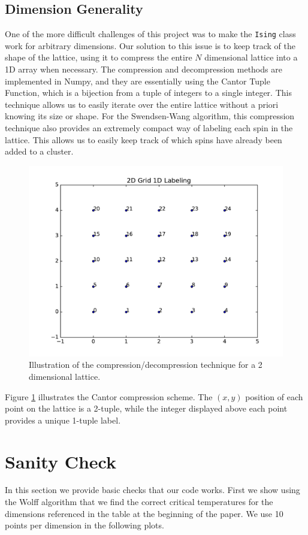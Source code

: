 \documentclass[a4paper]{article}
\begin{document}
\subsection{Dimension Generality}

One of the more difficult challenges of this project was to make the \texttt{Ising} class work for arbitrary dimensions. Our solution to this issue is to keep track of the shape of the lattice, using it to compress the entire $N$ dimensional lattice into a 1D array when necessary. The compression and decompression methods are implemented in Numpy, and they are essentially using the Cantor Tuple Function, which is a bijection from a tuple of integers to a single integer. This technique allows us to easily iterate over the entire lattice without a priori knowing its size or shape. For the Swendsen-Wang algorithm, this compression technique also provides an extremely compact way of labeling each spin in the lattice. This allows us to easily keep track of which spins have already been added to a cluster.


\begin{figure}[htb!]
	\centering \includegraphics[width=\linewidth]{compress.pdf}
	\caption{Illustration of the compression/decompression technique for a 2 dimensional lattice. }
	\label{fig:cantor}
\end{figure}
Figure \ref{fig:cantor} illustrates the Cantor compression scheme. The $(x,y)$ position of each point on the lattice is a 2-tuple, while the integer displayed above each point provides a unique 1-tuple label.

\section{Sanity Check}
In this section we provide basic checks that our code works. First we show using the Wolff algorithm that we find the correct critical temperatures for the dimensions referenced in the table at the beginning of the paper. We use 10 points per dimension in the following plots.
\end{document}
